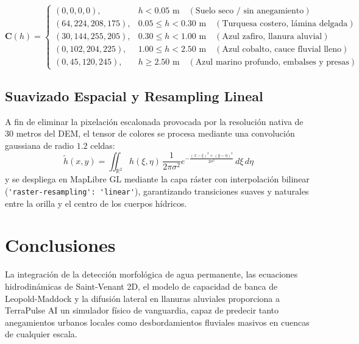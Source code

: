 \documentclass[11pt,a4paper]{article}
\begin{document}
\begin{equation}
  \mathbf{C}(h) =
  \begin{cases}
    (0, 0, 0, 0), & h < 0.05\text{ m} \quad (\text{Suelo seco / sin anegamiento}) \\
    (64, 224, 208, 175), & 0.05 \le h < 0.30\text{ m} \quad (\text{Turquesa costero, lámina delgada}) \\
    (30, 144, 255, 205), & 0.30 \le h < 1.00\text{ m} \quad (\text{Azul zafiro, llanura aluvial}) \\
    (0, 102, 204, 225), & 1.00 \le h < 2.50\text{ m} \quad (\text{Azul cobalto, cauce fluvial lleno}) \\
    (0, 45, 120, 245), & h \ge 2.50\text{ m} \quad (\text{Azul marino profundo, embalses y presas})
  \end{cases}
\end{equation}

\subsection{Suavizado Espacial y Resampling Lineal}

A fin de eliminar la pixelación escalonada provocada por la resolución nativa de 30 metros del DEM, el tensor de colores se procesa mediante una convolución gaussiana de radio $1.2$ celdas:
\begin{equation}
  \tilde{h}(x,y) = \iint_{\mathbb{R}^2} h(\xi,\eta) \, \frac{1}{2\pi \sigma^2} e^{-\frac{(x-\xi)^2 + (y-\eta)^2}{2\sigma^2}} \, d\xi\,d\eta
\end{equation}
y se despliega en MapLibre GL mediante la capa ráster con interpolación bilinear (\lstinline{'raster-resampling': 'linear'}), garantizando transiciones suaves y naturales entre la orilla y el centro de los cuerpos hídricos.

\section{Conclusiones}

La integración de la detección morfológica de agua permanente, las ecuaciones hidrodinámicas de Saint-Venant 2D, el modelo de capacidad de banca de Leopold-Maddock y la difusión lateral en llanuras aluviales proporciona a TerraPulse AI un simulador físico de vanguardia, capaz de predecir tanto anegamientos urbanos locales como desbordamientos fluviales masivos en cuencas de cualquier escala.
\end{document}
